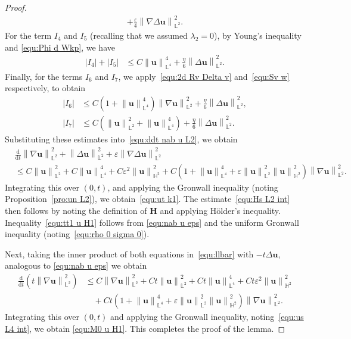 \documentclass[11pt, reqno]{amsart}
\theoremstyle{definition}
\numberwithin{equation}{section}
\newcommand{\bff}{\boldsymbol}
\newcommand{\bb}{\mathbb}
\newcommand{\ddt}{\frac{\mathrm{d}}{\mathrm{d}t}}
\newcommand{\norm}[2]{\left\|{#1}\right\|_{#2}}
\newcommand{\abs}[1]{\left|{#1}\right|}
\begin{document}
\begin{proof}
\begin{align*}
    +
    \frac{\varepsilon}{4} \norm{\nabla\Delta \bff{u}}{\bb{L}^2}^2.
\end{align*}
For the term $I_4$ and $I_5$ (recalling that we assumed $\lambda_2=0$), by Young's inequality and \eqref{equ:Phi d Wkp}, we have
\begin{align*}
    \abs{I_4}+ \abs{I_5}
    &\leq
    C\norm{\bff{u}}{\bb{L}^4}^4 + \frac{\eta}{6} \norm{\Delta \bff{u}}{\bb{L}^2}^2.
\end{align*}
Finally, for the terms $I_6$ and $I_7$, we apply~\eqref{equ:2d Rv Delta v} and~\eqref{equ:Sv w} respectively, to obtain
\begin{align*}
    \abs{I_6}
    &\leq
    C\left(1+\norm{\bff{u}}{\bb{L}^4}^4 \right) \norm{\nabla \bff{u}}{\bb{L}^2}^2
    +
    \frac{\eta}{6} \norm{\Delta \bff{u}}{\bb{L}^2}^2,
    \\
    \abs{I_7}
    &\leq
    C\left(\norm{\bff{u}}{\bb{L}^2}^2 + \norm{\bff{u}}{\bb{L}^4}^4\right)
    +
    \frac{\eta}{6} \norm{\Delta \bff{u}}{\bb{L}^2}^2.
\end{align*}
Substituting these estimates into~\eqref{equ:ddt nab u L2}, we obtain
\begin{align}\label{equ:nab u eps}
    &\ddt \norm{\nabla \bff{u}}{\bb{L}^2}^2
    +
    \norm{\Delta \bff{u}}{\bb{L}^2}^2
    +
    \varepsilon \norm{\nabla\Delta \bff{u}}{\bb{L}^2}^2
    \nonumber \\
    &\leq
    C \norm{\bff{u}}{\bb{L}^2}^2 
    +
    C \norm{\bff{u}}{\bb{L}^4}^4
    +
    C \varepsilon^2 \norm{\bff{u}}{\bb{H}^2}^2
    +
    C\left(1+\norm{\bff{u}}{\bb{L}^4}^4+ \varepsilon \norm{\bff{u}}{\bb{L}^2}^2 \norm{\bff{u}}{\bb{H}^2}^2 \right) \norm{\nabla \bff{u}}{\bb{L}^2}^2.
\end{align}
Integrating this over $(0,t)$, and applying the Gronwall inequality (noting Proposition~\ref{pro:un L2}), we obtain~\eqref{equ:ut k1}. The estimate~\eqref{equ:Hs L2 int} then follows by noting the definition of $\bff{H}$ and applying H\"older's inequality. Inequality~\eqref{equ:tt1 u H1} follows from \eqref{equ:nab u eps} and the uniform Gronwall inequality (noting~\eqref{equ:rho 0 sigma 0}).

Next, taking the inner product of both equations in~\eqref{equ:llbar} with $-t\Delta \bff{u}$, analogous to \eqref{equ:nab u eps} we obtain
\begin{align*}
    \ddt \left(t \norm{\nabla \bff{u}}{\bb{L}^2}^2\right)
    &\leq
    C\norm{\nabla \bff{u}}{\bb{L}^2}^2
    +
    Ct \norm{\bff{u}}{\bb{L}^2}^2 
    +
    Ct \norm{\bff{u}}{\bb{L}^4}^4
    +
    Ct \varepsilon^2 \norm{\bff{u}}{\bb{H}^2}^2
    \\
    &\quad
    +
    Ct\left(1+\norm{\bff{u}}{\bb{L}^4}^4+ \varepsilon \norm{\bff{u}}{\bb{L}^2}^2 \norm{\bff{u}}{\bb{H}^2}^2 \right) \norm{\nabla \bff{u}}{\bb{L}^2}^2.
\end{align*}
Integrating this over $(0,t)$ and applying the Gronwall inequality, noting~\eqref{equ:us L4 int}, we obtain \eqref{equ:M0 u H1}.
This completes the proof of the lemma.
\end{proof}
\end{document}
